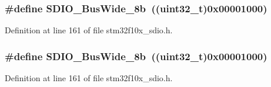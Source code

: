 \subsubsection[{\texorpdfstring{S\+D\+I\+O\+\_\+\+Bus\+Wide\+\_\+8b}{SDIO_BusWide_8b}}]{\setlength{\rightskip}{0pt plus 5cm}\#define S\+D\+I\+O\+\_\+\+Bus\+Wide\+\_\+8b~(({\bf uint32\+\_\+t})0x00001000)}\hypertarget{group___s_d_i_o___bus___wide_ga4d864f5c4e1af298146afc1d680081e9}{}\label{group___s_d_i_o___bus___wide_ga4d864f5c4e1af298146afc1d680081e9}


Definition at line 161 of file stm32f10x\+\_\+sdio.\+h.

\subsubsection[{\texorpdfstring{S\+D\+I\+O\+\_\+\+Bus\+Wide\+\_\+8b}{SDIO_BusWide_8b}}]{\setlength{\rightskip}{0pt plus 5cm}\#define S\+D\+I\+O\+\_\+\+Bus\+Wide\+\_\+8b~(({\bf uint32\+\_\+t})0x00001000)}\hypertarget{group___s_d_i_o___bus___wide_ga4d864f5c4e1af298146afc1d680081e9}{}\label{group___s_d_i_o___bus___wide_ga4d864f5c4e1af298146afc1d680081e9}


Definition at line 161 of file stm32f10x\+\_\+sdio.\+h.

